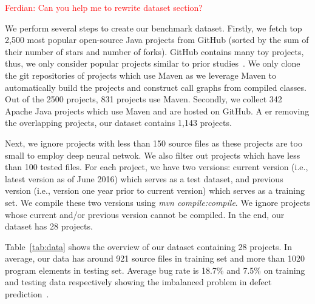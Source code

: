 
\textcolor{red}{Ferdian: Can you help me to rewrite dataset section?}

We perform several steps to create our benchmark dataset. Firstly, we fetch top 2,500 most popular open-source Java projects from GitHub (sorted by the sum of their number of stars and number of forks). GitHub contains many toy projects, thus, we only consider popular projects similar to prior studies~\cite{ray2014large, kochhar2016large}. We only clone the git repositories of projects which use Maven as we leverage Maven to automatically build the projects and construct call graphs from compiled classes. Out of the 2500 projects, 831 projects use Maven. Secondly, we collect 342 Apache Java projects which use Maven and are hosted on GitHub. A er removing the overlapping projects, our dataset contains 1,143 projects.

Next, we ignore projects with less than 150 source files as these projects are too small to employ deep neural netwok. We also  filter out projects which have less than 100 tested files. For each project, we have two versions: current version (i.e., latest version as of June 2016) which serves as a test dataset, and previous version (i.e., version one year prior to current version) which serves as a training set. We compile these two versions using \textit{mvn compile:compile}. We ignore projects whose current and/or previous version cannot be compiled. In the end, our dataset has 28 projects.

Table~\ref{tab:data} shows the overview of our dataset containing 28 projects. In average, our data has around 921 source files in training set and more than 1020 program elements in testing set. Average bug rate is 18.7\% and 7.5\% on training and testing data respectively showing the imbalanced problem in defect prediction~\cite{wang2013using, khoshgoftaar2010attribute}. 

